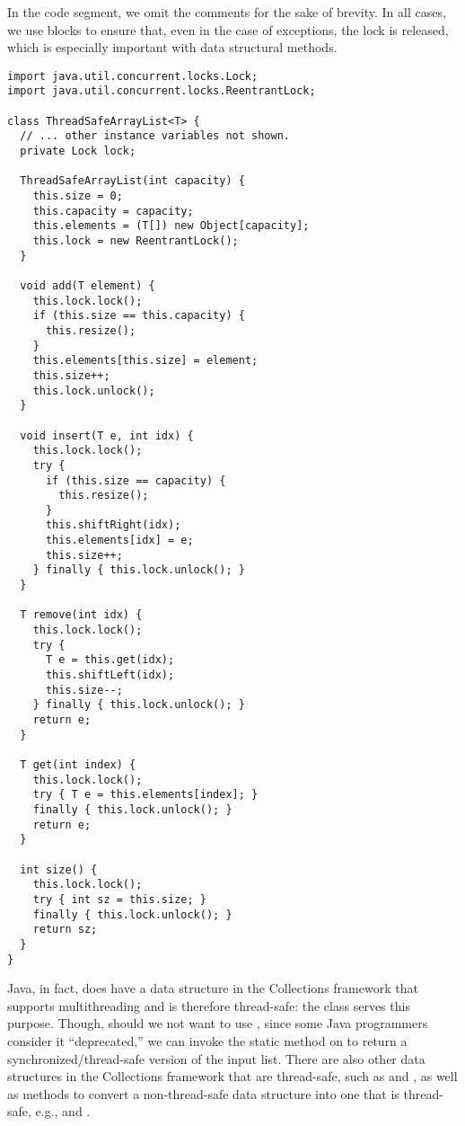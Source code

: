 In the code segment, we omit the comments for the sake of brevity. 
In all cases, we use  blocks to ensure that, even in the case of exceptions, the lock is released, which is especially important with data structural methods.

\begin{lstlisting}[language=MyJava]
import java.util.concurrent.locks.Lock;
import java.util.concurrent.locks.ReentrantLock;

class ThreadSafeArrayList<T> {
  // ... other instance variables not shown.
  private Lock lock;

  ThreadSafeArrayList(int capacity) {
    this.size = 0;
    this.capacity = capacity;
    this.elements = (T[]) new Object[capacity];
    this.lock = new ReentrantLock();
  }

  void add(T element) {
    this.lock.lock();
    if (this.size == this.capacity) { 
      this.resize(); 
    }
    this.elements[this.size] = element;
    this.size++;
    this.lock.unlock();
  }

  void insert(T e, int idx) {
    this.lock.lock();
    try {
      if (this.size == capacity) { 
        this.resize(); 
      }
      this.shiftRight(idx);
      this.elements[idx] = e;
      this.size++;
    } finally { this.lock.unlock(); }
  }

  T remove(int idx) {
    this.lock.lock();
    try {
      T e = this.get(idx);
      this.shiftLeft(idx);
      this.size--;
    } finally { this.lock.unlock(); }
    return e;
  }

  T get(int index) {
    this.lock.lock();
    try { T e = this.elements[index]; }
    finally { this.lock.unlock(); }
    return e;
  }

  int size() {
    this.lock.lock();
    try { int sz = this.size; }
    finally { this.lock.unlock(); }
    return sz;
  }
}
\end{lstlisting}

Java, in fact, does have a data structure in the Collections framework that supports multithreading and is therefore thread-safe: the  class serves this purpose. 
Though, should we not want to use , since some Java programmers consider it ``deprecated,'' we can invoke the static  method on  to return a synchronized/thread-safe version of the input list. 
There are also other data structures in the Collections framework that are thread-safe, such as  and , as well as methods to convert a non-thread-safe data structure into one that is thread-safe, e.g.,  and .

